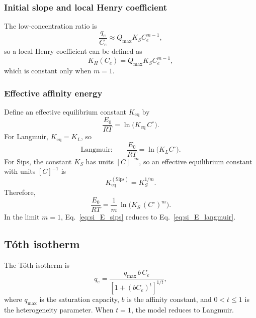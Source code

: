 \documentclass[journal=aamick,manuscript=article]{achemso}
\begin{document}
\subsubsection{Initial slope and local Henry coefficient}

The low-concentration ratio is
\begin{equation}
	\frac{q_e}{C_e}
	\approx Q_{\max} K_S C_e^{m-1},
\end{equation}
so a local Henry coefficient can be defined as
\begin{equation}
	K_H(C_e) = Q_{\max} K_S C_e^{m - 1},
\end{equation}
which is constant only when \(m = 1\).

\subsubsection{Effective affinity energy}

Define an effective equilibrium constant \(K_{\mathrm{eq}}\) by
\begin{equation}
	\frac{E_0}{RT} = \ln\!\big(K_{\mathrm{eq}}\,C^\circ\big).
	\label{eq:si_E_def}
\end{equation}
For Langmuir, \(K_{\mathrm{eq}} = K_L\), so
\begin{equation}
	\text{Langmuir:}\qquad
	\frac{E_0}{RT} = \ln\!\big(K_L C^\circ\big).
	\label{eq:si_E_langmuir}
\end{equation}
For Sips, the constant \(K_S\) has units \([C]^{-m}\), so an effective
equilibrium constant with units \([C]^{-1}\) is
\begin{equation}
	K_{\mathrm{eq}}^{\mathrm{(Sips)}} = K_S^{1/m}.
\end{equation}
Therefore,
\begin{equation}
	\frac{E_0}{RT}
	= \frac{1}{m}\,\ln\!\big(K_S\,(C^\circ)^{m}\big).
	\label{eq:si_E_sips}
\end{equation}
In the limit \(m = 1\), Eq.~\eqref{eq:si_E_sips} reduces to
Eq.~\eqref{eq:si_E_langmuir}.

\subsection{T\'{o}th isotherm}
\label{sec:si_toth}

The T\'{o}th isotherm is
\begin{equation}
	q_e = \frac{q_{\max}\, b\, C_e}{\left[1 + (b C_e)^t\right]^{1/t}},
	\label{eq:si_toth}
\end{equation}
where $q_{\max}$ is the saturation capacity, $b$ is the affinity
constant, and $0 < t \leq 1$ is the heterogeneity parameter.
When $t = 1$, the model reduces to Langmuir.
\end{document}
